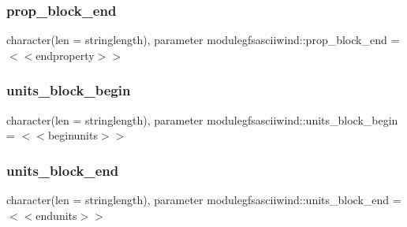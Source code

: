 \subsubsection{\texorpdfstring{prop\+\_\+block\+\_\+end}{prop\_block\_end}}
{\footnotesize\ttfamily character(len = stringlength), parameter modulegfsasciiwind\+::prop\+\_\+block\+\_\+end = \textquotesingle{}$<$$<$endproperty$>$$>$\textquotesingle{}\hspace{0.3cm}{\ttfamily [private]}}

\mbox{\label{namespacemodulegfsasciiwind_af4903f24bfb8c26bad841c76f24ffc97}} 
\subsubsection{\texorpdfstring{units\+\_\+block\+\_\+begin}{units\_block\_begin}}
{\footnotesize\ttfamily character(len = stringlength), parameter modulegfsasciiwind\+::units\+\_\+block\+\_\+begin = \textquotesingle{}$<$$<$beginunits$>$$>$\textquotesingle{}\hspace{0.3cm}{\ttfamily [private]}}

\mbox{\label{namespacemodulegfsasciiwind_ab88fa85792b55aff45b9916708cf12ae}} 
\subsubsection{\texorpdfstring{units\+\_\+block\+\_\+end}{units\_block\_end}}
{\footnotesize\ttfamily character(len = stringlength), parameter modulegfsasciiwind\+::units\+\_\+block\+\_\+end = \textquotesingle{}$<$$<$endunits$>$$>$\textquotesingle{}\hspace{0.3cm}{\ttfamily [private]}}

